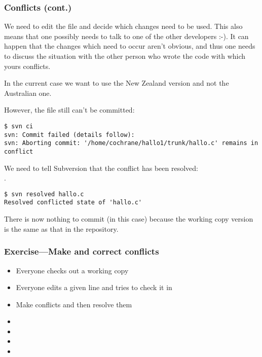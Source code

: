 \begin{frame}[fragile]
    \frametitle{Conflicts (cont.)}
    \linuxframe

    We need to edit the file and decide which changes need to be used.  This
    also means that one possibly needs to talk to one of the other
    developers :-).  It can happen that the changes which need to occur
    aren't obvious, and thus one needs to discuss the situation with the
    other person who wrote the code with which yours conflicts.

    In the current case we want to use the New Zealand version and not the
    Australian one.

    However, the file still can't be committed:
\begin{lstlisting}[basicstyle=\tiny\ttfamily\color{black}]
$ svn ci
svn: Commit failed (details follow):
svn: Aborting commit: '/home/cochrane/hallo1/trunk/hallo.c' remains in conflict
\end{lstlisting}

    We need to tell Subversion that the conflict has been resolved:\\
    .
\begin{lstlisting}[basicstyle=\tiny\ttfamily\color{black}]
$ svn resolved hallo.c
Resolved conflicted state of 'hallo.c'
\end{lstlisting}

    There is now nothing to commit (in this case) because the working copy
    version is the same as that in the repository.
\end{frame}

\begin{frame}[fragile]
    \frametitle{Exercise---Make and correct conflicts}
    \begin{itemize}
        \item Everyone checks out a  working copy
        \item Everyone edits a given line and tries to check it in
        \item Make conflicts and then resolve them
        \item {}
        \item {}
        \item {}
        \item {}
    \end{itemize}
\end{frame}


